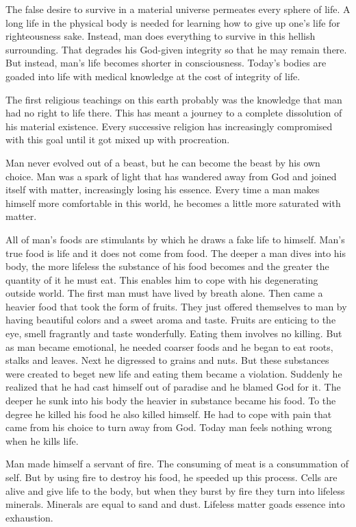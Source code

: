 \documentclass[landscape,twocolumn,letterpaper]{article}
\begin{document}
The false desire to survive in a material universe permeates every
sphere of life. A long life in the physical body is needed for
learning how to give up one's life for righteousness sake. Instead,
man does everything to survive in this hellish surrounding. That
degrades his God-given integrity so that he may remain there. But
instead, man's life becomes shorter in consciousness. Today's bodies
are goaded into life with medical knowledge at the cost of integrity
of life.

The first religious teachings on this earth probably was the knowledge
that man had no right to life there. This has meant a journey to a
complete dissolution of his material existence. Every successive
religion has increasingly compromised with this goal until it got
mixed up with procreation.

Man never evolved out of a beast, but he can become the beast by his
own choice. Man was a spark of light that has wandered away from God
and joined itself with matter, increasingly losing his essence. Every
time a man makes himself more comfortable in this world, he becomes a
little more saturated with matter.

All of man's foods are stimulants by which he draws a fake life to
himself. Man's true food is life and it does not come from food. The
deeper a man dives into his body, the more lifeless the substance of
his food becomes and the greater the quantity of it he must eat. This
enables him to cope with his degenerating outside world.  The first
man must have lived by breath alone. Then came a heavier food that
took the form of fruits. They just offered themselves to man by having
beautiful colors and a sweet aroma and taste. Fruits are enticing to
the eye, smell fragrantly and taste wonderfully. Eating them involves
no killing. But as man became emotional, he needed coarser foods and
he began to eat roots, stalks and leaves. Next he digressed to grains
and nuts. But these substances were created to beget new life and
eating them became a violation. Suddenly he realized that he had cast
himself out of paradise and he blamed God for it. The deeper he sunk
into his body the heavier in substance became his food. To the degree
he killed his food he also killed himself. He had to cope with pain
that came from his choice to turn away from God. Today man feels
nothing wrong when he kills life.

Man made himself a servant of fire. The consuming of meat is a
consummation of self. But by using fire to destroy his food, he
speeded up this process. Cells are alive and give life to the body,
but when they burst by fire they turn into lifeless minerals. Minerals
are equal to sand and dust. Lifeless matter goads essence into
exhaustion.
\end{document}
